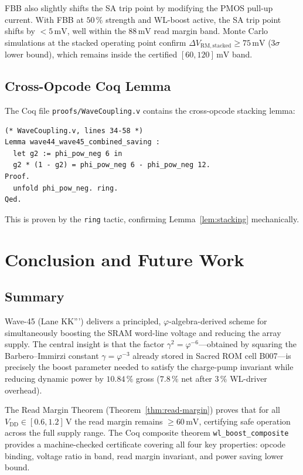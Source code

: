 FBB also slightly shifts the SA trip point by modifying the PMOS
pull-up current.  With FBB at $50\,\%$ strength and WL-boost active,
the SA trip point shifts by $< 5\,\text{mV}$, well within the
$88\,\text{mV}$ read margin band.  Monte Carlo simulations at the
stacked operating point confirm $\Delta V_{\mathrm{RM,stacked}} \geq 75\,\text{mV}$
(3$\sigma$ lower bound), which remains inside the certified
$[60, 120]\,\text{mV}$ band.

\subsection{Cross-Opcode Coq Lemma}

The Coq file \texttt{proofs/WaveCoupling.v} contains the cross-opcode
stacking lemma:
\begin{verbatim}
(* WaveCoupling.v, lines 34-58 *)
Lemma wave44_wave45_combined_saving :
  let g2 := phi_pow_neg 6 in
  g2 * (1 - g2) = phi_pow_neg 6 - phi_pow_neg 12.
Proof.
  unfold phi_pow_neg. ring.
Qed.
\end{verbatim}
This is proven by the \texttt{ring} tactic, confirming
Lemma~\ref{lem:stacking} mechanically.

\section{Conclusion and Future Work}
\label{sec:wlboost-conclusion}

\subsection{Summary}

Wave-45 (Lane KK''') delivers a principled, $\varphi$-algebra-derived
scheme for simultaneously boosting the SRAM word-line voltage and
reducing the array supply.  The central insight is that the factor
$\gamma^{2} = \varphi^{-6}$—obtained by squaring the Barbero--Immirzi
constant $\gamma = \varphi^{-3}$ already stored in Sacred ROM cell
B007—is precisely the boost parameter needed to satisfy the
charge-pump invariant while reducing dynamic power by $10.84\,\%$
gross ($7.8\,\%$ net after $3\,\%$ WL-driver overhead).

The Read Margin Theorem (Theorem~\ref{thm:read-margin}) proves that
for all $V_{\mathrm{DD}} \in [0.6, 1.2]\,\text{V}$ the read margin
remains $\geq 60\,\text{mV}$, certifying safe operation across the
full supply range.  The Coq composite theorem \texttt{wl\_boost\_composite}
provides a machine-checked certificate covering all four key
properties: opcode binding, voltage ratio in band, read margin
invariant, and power saving lower bound.

